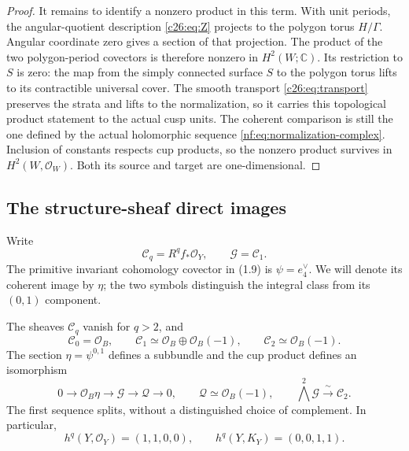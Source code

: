 \begin{proof}
It remains to identify a nonzero product in this term. With unit
periods, the angular-quotient description
\eqref{c26:eq:Z} projects to the polygon torus $H/\Gamma$.
Angular coordinate zero gives a section of that projection.
The product of the two polygon-period covectors is therefore
nonzero in $H^2(W;\mathbb C)$. Its restriction to $S$ is zero:
the map from the simply connected surface $S$ to the polygon
torus lifts to its contractible universal cover.
The smooth transport \eqref{c26:eq:transport} preserves the
strata and lifts to the normalization, so it carries this
topological product statement to the actual cusp units.
The coherent comparison is still the one defined by the actual
holomorphic sequence \eqref{nf:eq:normalization-complex}.
Inclusion of constants respects cup products, so the nonzero
product survives in $H^2(W,\mathcal O_W)$. Both its source and
target are one-dimensional.
\end{proof}

\subsection{The structure-sheaf direct images}

Write
\[
 \mathcal C_q=R^qf_*\mathcal O_Y,\qquad \mathcal G=\mathcal C_1.
\]
The primitive invariant cohomology covector in (1.9) is
$\psi=e_4^\vee$. We will denote its coherent image by $\eta$;
the two symbols distinguish the integral class from its
$(0,1)$ component.

\begin{theorem}\label{nf:thm:coherent}
The sheaves $\mathcal C_q$ vanish for $q>2$, and
\begin{equation}\label{nf:eq:coherent-bundles}
 \mathcal C_0=\mathcal O_B,\qquad
 \mathcal C_1\simeq\mathcal O_B\oplus\mathcal O_B(-1),\qquad
 \mathcal C_2\simeq\mathcal O_B(-1).
\end{equation}
The section $\eta=\psi^{0,1}$ defines a subbundle and the cup
product defines an isomorphism
\begin{equation}\label{nf:eq:G-sequence}
 0\longrightarrow\mathcal O_B\eta\longrightarrow\mathcal G
 \longrightarrow\mathcal Q\longrightarrow0,\qquad
 \mathcal Q\simeq\mathcal O_B(-1),\qquad
 \bigwedge^2\mathcal G\xrightarrow{\ \sim\ }\mathcal C_2.
\end{equation}
The first sequence splits, without a distinguished choice of
complement. In particular,
\[
 h^q(Y,\mathcal O_Y)=(1,1,0,0),\qquad
 h^q(Y,K_Y)=(0,0,1,1).
\]
\end{theorem}

